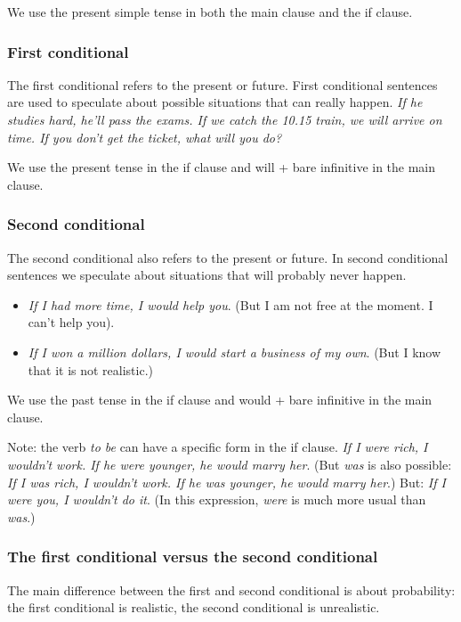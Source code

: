 We use the present simple tense in both the main clause and the if clause.

\subsubsection{First conditional}

The first conditional refers to the present or future. First conditional sentences are used to speculate about possible situations that can really happen.
\textit{If he studies hard, he'll pass the exams. If we catch the 10.15 train, we will arrive on time. If you don't get the ticket, what will you do?}

We use the present tense in the if clause and will + bare infinitive in the main clause.

\subsubsection{Second conditional}

The second conditional also refers to the present or future. In second conditional sentences we speculate about situations that will probably never happen.

\begin{itemize}
\item \textit{If I had more time, I would help you}. (But I am not free at the moment. I can't help you). 
\item \textit{If I won a million dollars, I would start a business of my own}.  (But I know that it is not realistic.)
\end{itemize}

We use the past tense in the if clause and would + bare infinitive in the main clause.

Note: the verb \textit{to be} can have a specific form in the if clause. 
\textit{If I were rich, I wouldn't work. If he were younger, he would marry her}.
(But \textit{was} is also possible: \textit{If I was rich, I wouldn't work. If he was younger, he would marry her}.) But: \textit{If I were you, I wouldn't do it}. (In this expression, \textit{were} is much more usual than \textit{was}.)

\subsubsection{The first conditional versus the second conditional}

The main difference between the first and second conditional is about probability: the first conditional is realistic, the second conditional is unrealistic. 

